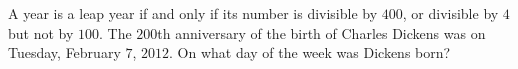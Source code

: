 A year is a leap year if and only if its number is divisible by $400$, or divisible by $4$ but not by $100$. The $200$th anniversary of the birth of Charles Dickens was on Tuesday, February $7$, $2012$. On what day of the week was Dickens born?
